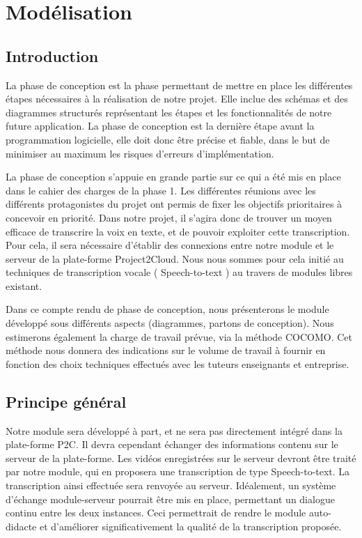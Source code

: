 	
	\part{Modélisation}
	\parttoc
	
	\setcounter{chapter}{0} %
	\setcounter{section}{0} %
	
	\renewcommand*{\theHchapter}{\thepart.\thechapter}
	\chapter{Introduction}
	La phase de conception est la phase permettant de mettre en place les différentes étapes nécessaires à la réalisation de notre projet. Elle inclue des schémas et des diagrammes structurés représentant les étapes et les fonctionnalités de notre future application. La phase de conception est la dernière étape avant la programmation logicielle, elle doit donc être précise et fiable, dans le but de minimiser au maximum les risques d'erreurs d'implémentation. 
	
	La phase de conception s'appuie en grande partie sur ce qui a été mis en place dans le cahier des charges de la phase 1. Les différentes réunions avec les différents protagonistes du projet ont permis de fixer les objectifs prioritaires à concevoir en priorité. Dans notre projet, il s'agira donc de trouver un moyen efficace de transcrire la voix en texte, et de pouvoir exploiter cette transcription. Pour  cela, il sera nécessaire d'établir des connexions entre notre module et le serveur de la plate-forme Project2Cloud. Nous nous sommes pour cela initié au techniques de transcription vocale ( Speech-to-text ) au travers de modules libres existant.

	 Dans ce compte rendu de phase de conception, nous présenterons le module développé sous différents aspects (diagrammes, partons de conception). Nous estimerons également la charge de travail prévue, via la méthode COCOMO. Cet méthode nous donnera des indications sur le volume de travail à fournir en fonction des choix techniques effectués avec les tuteurs enseignants et entreprise. 


	\chapter{Principe général}
	Notre module sera développé à part, et ne sera pas directement intégré dans la plate-forme P2C. Il devra cependant échanger des informations contenu sur le serveur de la plate-forme. Les vidéos enregistrées sur le serveur devront être traité par notre module, qui en proposera une transcription de type Speech-to-text. La transcription ainsi effectuée sera renvoyée au serveur. Idéalement, un système d'échange module-serveur pourrait être mis en place, permettant un dialogue continu entre les deux instances. Ceci permettrait de rendre le module auto-didacte et d'améliorer significativement la qualité de la transcription proposée.
	
